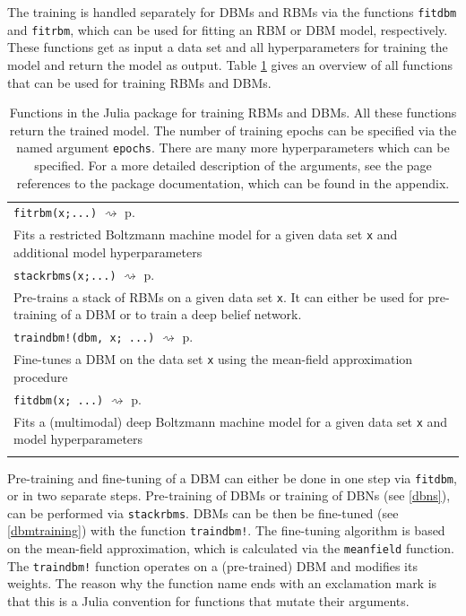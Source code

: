 \documentclass[12pt]{article}
\newcommand{\inlinecode}[1]{\texttt{#1}}
\newcommand{\rightpageref}[1]{\hfill $\rightsquigarrow$ p.\ \pageref{#1}}
\begin{document}
The training is handled separately for DBMs and RBMs via the functions \inlinecode{fitdbm} and \inlinecode{fitrbm}, which can be used for fitting an RBM or DBM model, respectively. 
These functions get as input a data set and all hyperparameters for training the model and return the model as output.
Table \ref{juliaFunTableTrain} gives an overview of all functions that can be used for training RBMs and DBMs.


\begin{table}[h]
\caption{Functions in the Julia package for training RBMs and DBMs. All these functions return the trained model. The number of training epochs can be specified via the named argument \inlinecode{epochs}. There are many more hyperparameters which can be specified. For a more detailed description of the arguments, see the page references to the package documentation, which can be found in the appendix.}\label{juliaFunTableTrain}
\begin{tabularx}{\textwidth}{X}
 \Xhline{1pt}
   \inlinecode{fitrbm(x;...)} \rightpageref{bms_fitrbm} \\
   Fits a restricted Boltzmann machine model for a given data set \inlinecode{x} and additional model hyperparameters \\
   \inlinecode{stackrbms(x;...)} \rightpageref{bms_stackrbms}\\
   Pre-trains a stack of RBMs on a given data set \inlinecode{x}. It can either be used for pre-training of a DBM or to train a deep belief network. \\
   \inlinecode{traindbm!(dbm, x; ...)} \rightpageref{bms_traindbm!} \\
   Fine-tunes a DBM on the data set \inlinecode{x} using the mean-field approximation procedure \\
     \inlinecode{fitdbm(x; ...)} \rightpageref{bms_fitdbm} \\
   Fits a (multimodal) deep Boltzmann machine model for a given data set \inlinecode{x} and model hyperparameters \\
 \Xhline{1pt}
\end{tabularx}
\end{table}

Pre-training and fine-tuning of a DBM can either be done in one step via \inlinecode{fitdbm}, or in two separate steps.
Pre-training of DBMs or training of DBNs (see \ref{dbns}), can be performed via \inlinecode{stackrbms}.
DBMs  can be then be fine-tuned (see \ref{dbmtraining}) with the function \inlinecode{traindbm!}.
The fine-tuning algorithm is based on the mean-field approximation, which is calculated via the \inlinecode{meanfield} function.
The \inlinecode{traindbm!} function operates on a (pre-trained) DBM and modifies its weights.
The reason why the function name ends with an exclamation mark is that this is a Julia convention for functions that mutate their arguments.
\end{document}
